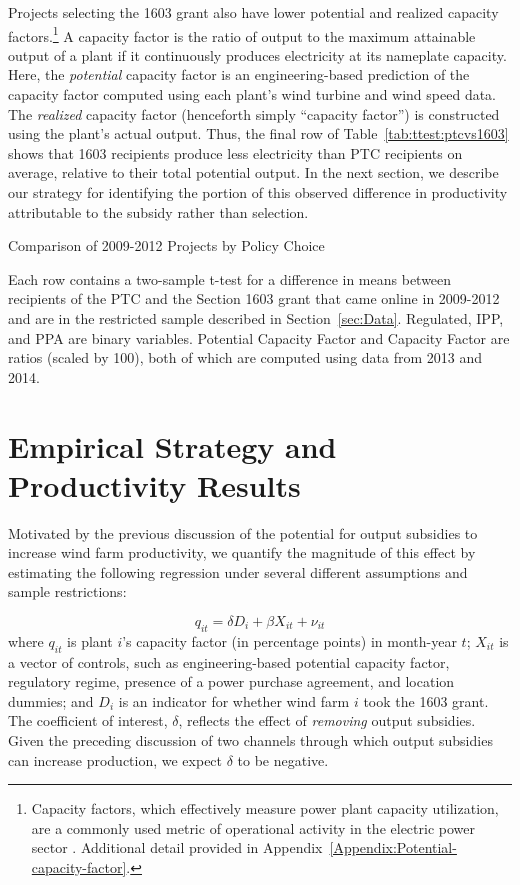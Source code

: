 \documentclass[12pt]{article}
\begin{document}
Projects selecting the 1603 grant also have lower potential and realized capacity factors.\footnote{Capacity factors, which effectively measure power plant capacity utilization, are a commonly used metric of operational activity in the electric power sector \citep[see, for example,][]{davis_deregulation_2012}. Additional detail provided in Appendix~\ref{Appendix:Potential-capacity-factor}.} A capacity factor is the ratio of output to the maximum attainable output of a plant if it continuously produces electricity at its nameplate capacity. Here, the \textit{potential} capacity factor is an engineering-based prediction of the capacity factor computed using each plant's wind turbine and wind speed data. The \textit{realized} capacity factor (henceforth simply ``capacity factor'') is constructed using the plant's actual output. Thus, the final row of Table~\ref{tab:ttest:ptcvs1603} shows that 1603 recipients produce less electricity than PTC recipients on average, relative to their total potential output. In the next section, we describe our strategy for identifying the portion of this observed difference in productivity attributable to the subsidy rather than selection.

\begin{table}[h]
\caption{Comparison of 2009-2012 Projects by Policy Choice\label{tab:ttest:ptcvs1603}}

\footnotesize
Each row contains a two-sample t-test for a difference in means between recipients of the PTC and the Section 1603 grant that came online in 2009-2012 and are in the restricted sample described in Section~\ref{sec:Data}. Regulated, IPP, and PPA are binary variables. Potential Capacity Factor and Capacity Factor are ratios (scaled by 100), both of which are computed using data from 2013 and 2014.
\end{table}

\section{Empirical Strategy and Productivity Results \label{sec:Empirical-Strategy}}

Motivated by the previous discussion of the potential for output subsidies to increase wind farm productivity, we quantify the magnitude of this effect by estimating the following regression under several different assumptions and sample restrictions:

\begin{equation}
q_{it}=\delta D_{i}+\beta X_{it}+\nu_{it}\label{eq:second_stage}
\end{equation}
where $q_{it}$ is plant $i$'s capacity factor (in percentage points) in month-year $t$; $X_{it}$ is a vector of controls, such as engineering-based potential capacity factor, regulatory regime, presence of a power purchase agreement, and location dummies; and $D_i$ is an indicator for whether wind farm $i$ took the 1603 grant. The coefficient of interest, $\delta$, reflects the effect of \emph{removing} output subsidies. Given the preceding discussion of two channels through which output subsidies can increase production, we expect $\delta$ to be negative.
\end{document}
